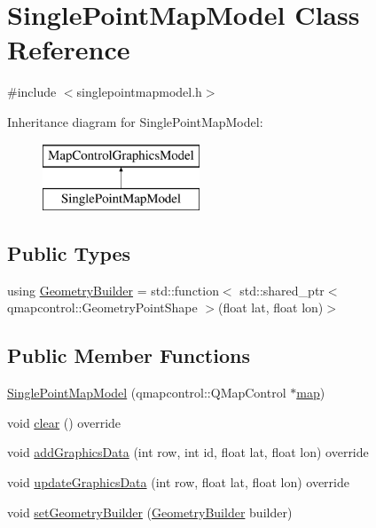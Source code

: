 \hypertarget{class_single_point_map_model}{}\section{Single\+Point\+Map\+Model Class Reference}
\label{class_single_point_map_model}


{\ttfamily \#include $<$singlepointmapmodel.\+h$>$}

Inheritance diagram for Single\+Point\+Map\+Model\+:\begin{figure}[H]
\begin{center}
\leavevmode
\includegraphics[height=2.000000cm]{de/d68/class_single_point_map_model}
\end{center}
\end{figure}
\subsection*{Public Types}
\begin{DoxyCompactItemize}
\item 
using \mbox{\hyperlink{class_single_point_map_model_a8e106dd385dec04227af0acf17372916}{Geometry\+Builder}} = std\+::function$<$ std\+::shared\+\_\+ptr$<$ qmapcontrol\+::\+Geometry\+Point\+Shape $>$(float lat, float lon)$>$
\end{DoxyCompactItemize}
\subsection*{Public Member Functions}
\begin{DoxyCompactItemize}
\item 
\mbox{\hyperlink{class_single_point_map_model_acbfc14524c3b8ca8f754611111342809}{Single\+Point\+Map\+Model}} (qmapcontrol\+::\+Q\+Map\+Control $\ast$\mbox{\hyperlink{class_map_control_graphics_model_ab2275e899196413e12f8146c407548c2}{map}})
\item 
void \mbox{\hyperlink{class_single_point_map_model_ae6778b1f7ed46f20b670dda409938266}{clear}} () override
\item 
void \mbox{\hyperlink{class_single_point_map_model_ade0986118e8cb4b9292c163d52ae6cb7}{add\+Graphics\+Data}} (int row, int id, float lat, float lon) override
\item 
void \mbox{\hyperlink{class_single_point_map_model_a40912bf3b978c4185ac9f390c55d37d6}{update\+Graphics\+Data}} (int row, float lat, float lon) override
\item 
void \mbox{\hyperlink{class_single_point_map_model_a86233a22a69504679095a6b107ba4539}{set\+Geometry\+Builder}} (\mbox{\hyperlink{class_single_point_map_model_a8e106dd385dec04227af0acf17372916}{Geometry\+Builder}} builder)
\end{DoxyCompactItemize}


